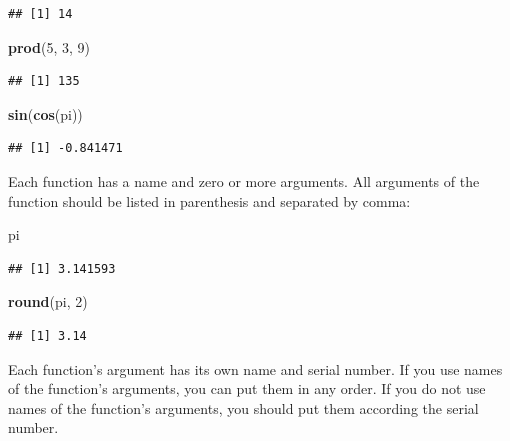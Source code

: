 \documentclass[
]{book}
\newenvironment{Shaded}{\begin{snugshade}}{\end{snugshade}}
\newcommand{\DecValTok}[1]{\textcolor[rgb]{0.00,0.00,0.81}{#1}}
\newcommand{\KeywordTok}[1]{\textcolor[rgb]{0.13,0.29,0.53}{\textbf{#1}}}
\newcommand{\NormalTok}[1]{#1}
\begin{document}
\begin{verbatim}
## [1] 14
\end{verbatim}

\begin{Shaded}
\begin{Highlighting}[]
\KeywordTok{prod}\NormalTok{(}\DecValTok{5}\NormalTok{, }\DecValTok{3}\NormalTok{, }\DecValTok{9}\NormalTok{)}
\end{Highlighting}
\end{Shaded}

\begin{verbatim}
## [1] 135
\end{verbatim}

\begin{Shaded}
\begin{Highlighting}[]
\KeywordTok{sin}\NormalTok{(}\KeywordTok{cos}\NormalTok{(pi))}
\end{Highlighting}
\end{Shaded}

\begin{verbatim}
## [1] -0.841471
\end{verbatim}

Each function has a name and zero or more arguments. All arguments of the function should be listed in parenthesis and separated by comma:

\begin{Shaded}
\begin{Highlighting}[]
\NormalTok{pi}
\end{Highlighting}
\end{Shaded}

\begin{verbatim}
## [1] 3.141593
\end{verbatim}

\begin{Shaded}
\begin{Highlighting}[]
\KeywordTok{round}\NormalTok{(pi, }\DecValTok{2}\NormalTok{)}
\end{Highlighting}
\end{Shaded}

\begin{verbatim}
## [1] 3.14
\end{verbatim}

Each function's argument has its own name and serial number. If you use names of the function's arguments, you can put them in any order. If you do not use names of the function's arguments, you should put them according the serial number.
\end{document}
